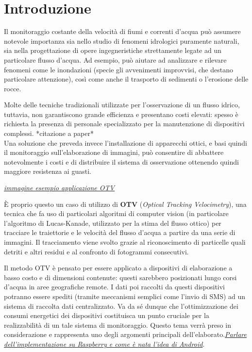 \documentclass[12pt,a4paper,openright,twoside]{report}
\begin{document}

\newpage
\clearpage{\pagestyle{empty}\cleardoublepage}



\chapter*{Introduzione}

Il monitoraggio costante della velocità di fiumi e correnti d'acqua può assumere notevole importanza sia nello studio di 
fenomeni idrologici puramente naturali, sia nella progettazione di opere ingegneristiche strettamente legate ad un 
particolare flusso d'acqua. Ad esempio, può aiutare ad analizzare e rilevare fenomeni come le inondazioni (specie gli 
avvenimenti improvvisi, che destano particolare attenzione), così come anche il trasporto di sedimenti o 
l'erosione delle rocce.

Molte delle tecniche tradizionali utilizzate per l'osservazione di un flusso idrico, tuttavia, non garantiscono 
grande efficienza e presentano costi elevati: spesso è richiesta la presenza di personale specializzato per la 
manutenzione di dispositivi complessi. *citazione a paper*\\ %
Una soluzione che preveda invece l'installazione di apparecchi ottici, e basi quindi il monitoraggio sull'elaborazione di
immagini, può consentire di abbattere notevolmente i costi e di distribuire il sistema di osservazione ottenendo quindi 
maggiore resistenza ai guasti.%

\textit{\underline{immagine esempio applicazione OTV}}

È proprio questo un caso di utilizzo di \textbf{OTV} (\textit{Optical Tracking Velocimetry}), una tecnica che fa uso di 
particolari algoritmi di computer vision (in particolare l'algoritmo di Lucas-Kanade, utilizzato per la stima del flusso 
ottico) per tracciare le traiettorie e le velocità del flusso d'acqua a partire da una serie di immagini. 
Il tracciamento viene svolto grazie al riconoscimento di particelle quali detriti e altri residui e al confronto di fotogrammi 
consecutivi.

Il metodo OTV è pensato per essere applicato a dispositivi di elaborazione a basso costo e di dimensioni contenute: questi
sarebbero posizionati lungo corsi d'acqua in aree geografiche remote. I dati poi raccolti da questi dispositivi potranno essere
spediti (tramite meccanismi semplici come l'invio di SMS) ad un sistema di raccolta dati centralizzato.
Va da sé dunque che l'ottimizzazione dei consumi energetici dei dispositivi costituisca un punto cruciale per la 
realizzabilità di un tale sistema di monitoraggio. Questo tema verrà preso in considerazione e rappresenta uno degli argomenti
principali dell'elaborato.\textit{\underline{Parlare dell'implementazione su Raspberry e come è nata l'idea di Android}}.\\
\end{document}
